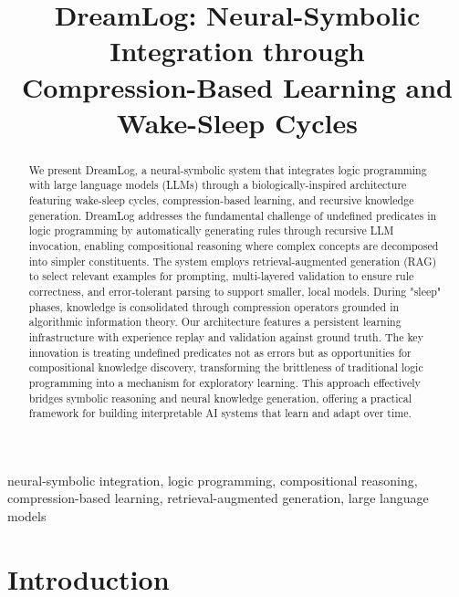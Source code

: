 \documentclass[10pt,conference]{IEEEtran}
\begin{document}
\title{DreamLog: Neural-Symbolic Integration through\\Compression-Based Learning and Wake-Sleep Cycles}

\author{
}

\maketitle

\begin{abstract}
We present DreamLog, a neural-symbolic system that integrates logic programming with large language models (LLMs) through a biologically-inspired architecture featuring wake-sleep cycles, compression-based learning, and recursive knowledge generation. DreamLog addresses the fundamental challenge of undefined predicates in logic programming by automatically generating rules through recursive LLM invocation, enabling compositional reasoning where complex concepts are decomposed into simpler constituents. The system employs retrieval-augmented generation (RAG) to select relevant examples for prompting, multi-layered validation to ensure rule correctness, and error-tolerant parsing to support smaller, local models. During "sleep" phases, knowledge is consolidated through compression operators grounded in algorithmic information theory. Our architecture features a persistent learning infrastructure with experience replay and validation against ground truth. The key innovation is treating undefined predicates not as errors but as opportunities for compositional knowledge discovery, transforming the brittleness of traditional logic programming into a mechanism for exploratory learning. This approach effectively bridges symbolic reasoning and neural knowledge generation, offering a practical framework for building interpretable AI systems that learn and adapt over time.
\end{abstract}

\begin{IEEEkeywords}
neural-symbolic integration, logic programming, compositional reasoning, compression-based learning, retrieval-augmented generation, large language models
\end{IEEEkeywords}

\section{Introduction}
\end{document}
